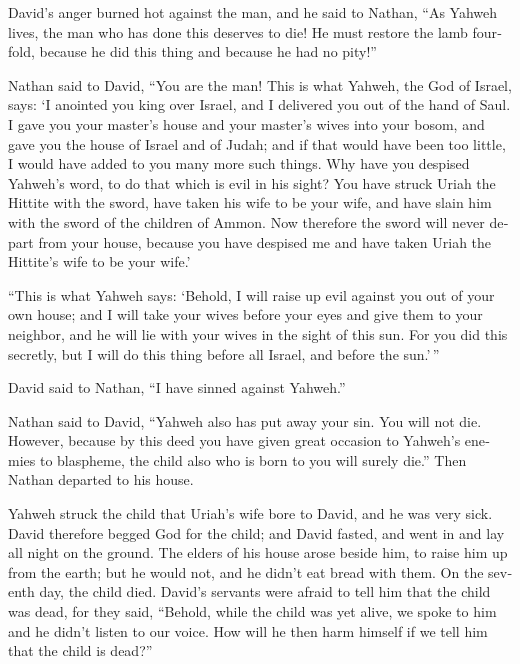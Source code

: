 \begin{paracol}{2}
\begin{otherlanguage}{english}
 David's anger burned hot against the man, and he said to
Nathan, ``As Yahweh lives, the man who has done this deserves to die!
 He must restore the lamb fourfold, because he did this
thing and because he had no pity!''

 Nathan said to David, ``You are the man! This is what
Yahweh, the God of Israel, says: `I anointed you king over Israel, and I
delivered you out of the hand of Saul.  I gave you your
master's house and your master's wives into your bosom, and gave you the
house of Israel and of Judah; and if that would have been too little, I
would have added to you many more such things.  Why have
you despised Yahweh's word, to do that which is evil in his sight? You
have struck Uriah the Hittite with the sword, have taken his wife to be
your wife, and have slain him with the sword of the children of Ammon.
 Now therefore the sword will never depart from your
house, because you have despised me and have taken Uriah the Hittite's
wife to be your wife.'

 ``This is what Yahweh says: `Behold, I will raise up
evil against you out of your own house; and I will take your wives
before your eyes and give them to your neighbor, and he will lie with
your wives in the sight of this sun.  For you did this
secretly, but I will do this thing before all Israel, and before the
sun.'\,''

 David said to Nathan, ``I have sinned against Yahweh.''

Nathan said to David, ``Yahweh also has put away your sin. You will not
die.  However, because by this deed you have given great
occasion to Yahweh's enemies to blaspheme, the child also who is born to
you will surely die.''  Then Nathan departed to his
house.

Yahweh struck the child that Uriah's wife bore to David, and he was very
sick.  David therefore begged God for the child; and
David fasted, and went in and lay all night on the ground.
 The elders of his house arose beside him, to raise him
up from the earth; but he would not, and he didn't eat bread with them.
 On the seventh day, the child died. David's servants
were afraid to tell him that the child was dead, for they said,
``Behold, while the child was yet alive, we spoke to him and he didn't
listen to our voice. How will he then harm himself if we tell him that
the child is dead?''


\end{otherlanguage}
\end{paracol}
